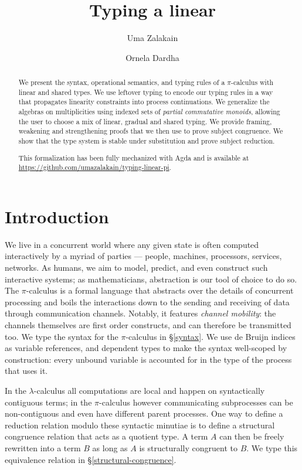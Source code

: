 \documentclass[a4paper,UKenglish,cleveref, autoref, thm-restate,authorcolumns]{lipics-v2019}
\title{Typing a linear \picalc}
\author{Uma Zalakain}{University of Glasgow, Scotland}
       {u.zalakain.1@research.gla.ac.uk}{https://orcid.org/0000-0002-3268-9338}{}
\author{Ornela Dardha}{University of Glasgow, Scotland}
       {ornela.dardha@glasgow.ac.uk}{https://orcid.org/0000-0001-9927-7875}{}
\theoremstyle{definition}
\newcommand{\lambdacalc}{$\lambda$-calculus}
\newcommand{\picalc}{$\pi$-calculus}
\begin{document}
\maketitle
{}

\begin{abstract}
  We present the syntax, operational semantics, and typing rules of a \picalc{} with linear and shared types.
  We use leftover typing \cite{Allais2018a} to encode our typing rules in a way that propagates linearity constraints into process continuations.
  We generalize the algebras on multiplicities using indexed sets of \emph{partial commutative monoids}, allowing the user to choose a mix of linear, gradual and shared typing.
  We provide framing, weakening and strengthening proofs that we then use to prove subject congruence.
  We show that the type system is stable under substitution and prove subject reduction.

  This formalization has been fully mechanized with Agda and is available at \url{https://github.com/umazalakain/typing-linear-pi}.
\end{abstract}

\section{Introduction}

We live in a concurrent world where any given state is often computed interactively by a myriad of parties --- people, machines, processors, services, networks.
As humans, we aim to model, predict, and even construct such interactive systems; as mathematicians, abstraction is our tool of choice to do so.
The \picalc{} \cite{} is a formal language that abstracts over the details of concurrent processing and boils the interactions down to the sending and receiving of data through communication channels.
Notably, it features \emph{channel mobility}: the channels themselves are first order constructs, and can therefore be transmitted too.
We type the syntax for the \picalc{} in \S \ref{syntax}.
We use de Bruijn indices \cite{} as variable references, and dependent types to make the syntax well-scoped by construction: every unbound variable is accounted for in the type of the process that uses it.

In the \lambdacalc{} all computations are local and happen on syntactically contiguous terms; in the \picalc{} however communicating subprocesses can be non-contiguous and even have different parent processes.
One way to define a reduction relation modulo these syntactic minutiae is to define a structural congruence \cite{} relation that acts as a quotient type.
A term $A$ can then be freely rewritten into a term $B$ as long as $A$ is structurally congruent to $B$.
We type this equivalence relation in \S \ref{structural-congruence}.
\end{document}
